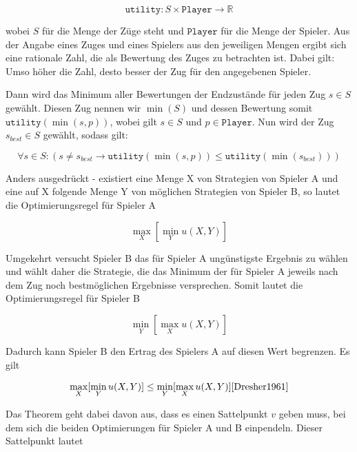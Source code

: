 \begin{equation}
\mathtt{utility}: S \times \mathtt{Player} \rightarrow \mathbb{R}
\end{equation}

wobei $S$ für die Menge der Züge steht und $\mathtt{Player}$ für die Menge der Spieler. Aus der Angabe eines Zuges und eines Spielers aus den jeweiligen Mengen ergibt sich eine rationale Zahl, die als Bewertung des Zuges zu betrachten ist. Dabei gilt: Umso höher die Zahl, desto besser der Zug für den angegebenen Spieler.

Dann wird das Minimum aller Bewertungen der Endzustände für jeden Zug $s \in S$ gewählt. Diesen Zug nennen wir $\min (S)$ und dessen Bewertung somit $\mathtt{utility}(\min (s, p))$, wobei gilt $s \in S$ und $p \in \mathtt{Player}$. Nun wird der Zug $s_{best} \in S$ gewählt, sodass gilt:

\begin{equation}
\forall s \in S : (s \neq s_{best} \rightarrow \mathtt{utility}(\min(s, p)) \leq \mathtt{utility}(\min(s_{best})))
\end{equation}

Anders ausgedrückt - existiert eine Menge X von Strategien von Spieler A und eine auf X folgende Menge Y von möglichen Strategien von Spieler B, so lautet die Optimierungsregel für Spieler A

\begin{equation}
\max\limits_X[\min\limits_Yu(X,Y)]
\end{equation}

Umgekehrt versucht Spieler B das für Spieler A ungünstigste Ergebnis zu wählen und wählt daher die Strategie, die das Minimum der für Spieler A jeweils nach dem Zug noch bestmöglichen Ergebnisse versprechen. Somit lautet die Optimierungsregel für Spieler B

\begin{equation}
\min\limits_Y[\max\limits_Xu(X,Y)]
\end{equation}


Dadurch kann Spieler B den Ertrag des Spielers A auf diesen Wert begrenzen. Es gilt

\begin{equation}
\max\limits_X[\min\limits_Yu(X,Y)] \leq \min\limits_Y[\max\limits_Xu(X,Y)] \cite{Dresher1961}
\end{equation}

Das Theorem geht dabei davon aus, dass es einen Sattelpunkt $v$ geben muss, bei dem sich die beiden Optimierungen für Spieler A und B einpendeln. Dieser Sattelpunkt lautet

